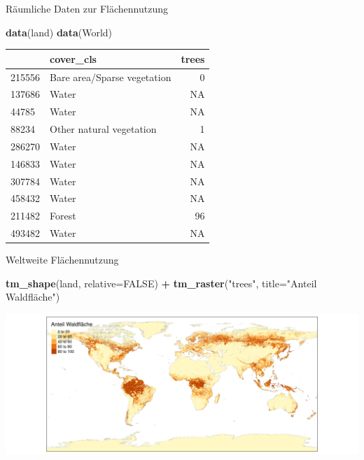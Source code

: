 \documentclass[ignorenonframetext,]{beamer}
\newenvironment{Shaded}{\begin{snugshade}}{\end{snugshade}}
\newcommand{\KeywordTok}[1]{\textcolor[rgb]{0.13,0.29,0.53}{\textbf{#1}}}
\newcommand{\DataTypeTok}[1]{\textcolor[rgb]{0.13,0.29,0.53}{#1}}
\newcommand{\StringTok}[1]{\textcolor[rgb]{0.31,0.60,0.02}{#1}}
\newcommand{\OtherTok}[1]{\textcolor[rgb]{0.56,0.35,0.01}{#1}}
\newcommand{\OperatorTok}[1]{\textcolor[rgb]{0.81,0.36,0.00}{\textbf{#1}}}
\newcommand{\NormalTok}[1]{#1}
\begin{document}
\begin{frame}[fragile]{Räumliche Daten zur Flächennutzung}

\begin{Shaded}
\begin{Highlighting}[]
\KeywordTok{data}\NormalTok{(land)}
\KeywordTok{data}\NormalTok{(World)}
\end{Highlighting}
\end{Shaded}

\begin{longtable}[]{@{}llr@{}}
\toprule
& cover\_cls & trees\tabularnewline
\midrule
\endhead
215556 & Bare area/Sparse vegetation & 0\tabularnewline
137686 & Water & NA\tabularnewline
44785 & Water & NA\tabularnewline
88234 & Other natural vegetation & 1\tabularnewline
286270 & Water & NA\tabularnewline
146833 & Water & NA\tabularnewline
307784 & Water & NA\tabularnewline
458432 & Water & NA\tabularnewline
211482 & Forest & 96\tabularnewline
493482 & Water & NA\tabularnewline
\bottomrule
\end{longtable}

\end{frame}

\begin{frame}[fragile]{Weltweite Flächennutzung}

\begin{Shaded}
\begin{Highlighting}[]
\KeywordTok{tm_shape}\NormalTok{(land,  }\DataTypeTok{relative=}\OtherTok{FALSE}\NormalTok{) }\OperatorTok{+}
\StringTok{    }\KeywordTok{tm_raster}\NormalTok{(}\StringTok{"trees"}\NormalTok{, }\DataTypeTok{title=}\StringTok{"Anteil Waldfläche"}\NormalTok{)}
\end{Highlighting}
\end{Shaded}

\includegraphics{tmap_files/figure-beamer/unnamed-chunk-39-1.pdf}

\end{frame}
\end{document}
